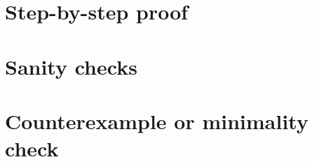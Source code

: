 \documentclass[11pt]{article}
\theoremstyle{definition}
\theoremstyle{plain}
\theoremstyle{remark}
\begin{document}
\section{Step-by-step proof}

\section{Sanity checks}

\section{Counterexample or minimality check}
\end{document}

